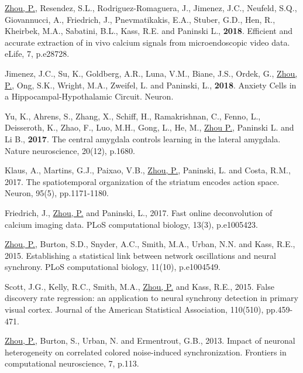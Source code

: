 \documentclass[paper=letter,fontsize=11pt]{scrartcl} %
\begin{document}
\begin{etaremune}
\item \ul{Zhou, P.}, Resendez, S.L., Rodriguez-Romaguera, J., Jimenez, J.C., Neufeld, S.Q., Giovannucci, A., Friedrich, J., Pnevmatikakis, E.A., Stuber, G.D., Hen, R., Kheirbek, M.A., Sabatini, B.L., Kass, R.E. and Paninski L., \textbf{2018}. Efficient and accurate extraction of in vivo calcium signals from microendoscopic video data. eLife, 7, p.e28728.

\item Jimenez, J.C., Su, K., Goldberg, A.R., Luna, V.M., Biane, J.S., Ordek, G., \ul{Zhou, P.}, Ong, S.K., Wright, M.A., Zweifel, L. and Paninski, L., \textbf{2018}. Anxiety Cells in a Hippocampal-Hypothalamic Circuit. Neuron.

\item Yu, K., Ahrens, S., Zhang, X., Schiff, H., Ramakrishnan, C., Fenno, L., Deisseroth, K., Zhao, F., Luo, M.H., Gong, L., He, M., \ul{Zhou P.}, Paninski L. and Li B., \textbf{2017}. The central amygdala controls learning in the lateral amygdala. Nature neuroscience, 20(12), p.1680.

\item Klaus, A., Martins, G.J., Paixao, V.B., \ul{Zhou, P.}, Paninski, L. and Costa, R.M., 2017. The spatiotemporal organization of the striatum encodes action space. Neuron, 95(5), pp.1171-1180.

\item Friedrich, J., \ul{Zhou, P.} and Paninski, L., 2017. Fast online deconvolution of calcium imaging data. PLoS computational biology, 13(3), p.e1005423.

\item \ul{Zhou, P.}, Burton, S.D., Snyder, A.C., Smith, M.A., Urban, N.N. and Kass, R.E., 2015. Establishing a statistical link between network oscillations and neural synchrony. PLoS computational biology, 11(10), p.e1004549.

\item Scott, J.G., Kelly, R.C., Smith, M.A., \ul{Zhou, P.} and Kass, R.E., 2015. False discovery rate regression: an application to neural synchrony detection in primary visual cortex. Journal of the American Statistical Association, 110(510), pp.459-471.

\item \ul{Zhou, P.}, Burton, S., Urban, N. and Ermentrout, G.B., 2013. Impact of neuronal heterogeneity on correlated colored noise-induced synchronization. Frontiers in computational neuroscience, 7, p.113.

\end{etaremune}
\end{document}
